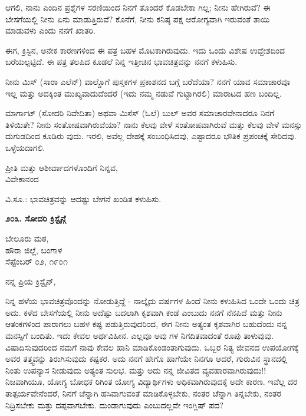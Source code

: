 ಆಗಲಿ, ನಾನು ಎಂದಿನ ಪ್ರಶ್ನೆಗಳ ಸರಣಿಯಿಂದ ನಿನಗೆ ತೊಂದರೆ ಕೊಡಬೇಕಾ ಗಿಲ್ಲ; ನೀನು ಹೇಗಿರುವೆ? ಈ ಬೇಸಗೆಯಲ್ಲಿ ನೀನು ಏನು ಮಾಡುತ್ತಿರುವೆ? ಕೊನೆಗೆ, ನೀನು ಕನಿಷ್ಠ ಪಕ್ಷ ಆರೋಗ್ಯವಾಗಿ ಇರುವಂತೆ ತಾಯಿ ಮಾಡುವಳು ಎಂದು ನನಗೆ ಖಾತರಿ.

ಈಗ, ಕ್ರಿಸ್ಟಿನ, ಅನೇಕ ಕಾರಣಗಳಿಂದ ಈ ಪತ್ರ ಬಹಳ ಮೊಟಕಾಗಿರುವುದು. ಇದು ಒಂದು ವಿಶೇಷ ಉದ್ದೇಶದಿಂದ ಬರೆಯಲ್ಪಟ್ಟಿದೆ. ಈ ಪತ್ರ ತಲಪಿದ ಕೂಡಲೆ ನಿನ್ನ ಇತ್ತೀಚಿನ ಭಾವಚಿತ್ರವನ್ನು ನನಗೆ ಕಳುಹಿಸು.

ನೀನು ಮಿಸ್ (ಸಾರಾ ಎಲೆನ್) ವಾಲ್ಡೊಗೆ ಪುಸ್ತಕಗಳ ಪ್ರಕಾಶನದ ಬಗ್ಗೆ ಬರೆದೆಯಾ? ನನಗೆ ಯಾವ ಸಮಾಚಾರವೂ ಇಲ್ಲ ಮತ್ತು ಅದಕ್ಕಿಂತ ಮುಖ್ಯವಾದುದೆಂದರೆ (ಇದು ನಮ್ಮ ನಡುವೆ ಗುಟ್ಟಾಗಿರಲಿ) ಮಾರಾಟದ ಹಣ ಬಂದಿಲ್ಲ.

ಮಾರ್ಗಾಟ್ (ಸೋದರಿ ನಿವೇದಿತಾ) ಅಥವಾ ಮಿಸೆಸ್ (ಓಲೆ) ಬುಲ್ ಅವರ ಸಮಾಚಾರವೇನಾದರೂ ನಿನಗೆ ತಿಳಿಯಿತೇ? ನೀನು ಸಂತೋಷವಾಗಿರುವೆಯಾ? ನಾನು ಕೆಲವು ವೇಳೆ ಸಂತೋಷವಾಗಿರುವೆ ಮತ್ತು ಕೆಲವು ವೇಳೆ ಮನಸ್ಸು ದುಗುಡದಿಂದ ಕೂಡಿರು ವುದು. ಇರಲಿ, ಅವೆಲ್ಲ ದೇಹಕ್ಕೆ ಸಂಬಂಧಿಸಿದವು, ಎಷ್ಟಾದರೂ ಭೌತಿಕ ಪ್ರಪಂಚಕ್ಕೆ ಸೇರಿದವು. ಒಳ್ಳೆಯದಾಗಲಿ.

\begin{flushright}
ಪ್ರೀತಿ ಮತ್ತು ಆಶೀರ್ವಾದಗಳೊಂದಿಗೆ ನಿನ್ನವ,\\ವಿವೇಕಾನಂದ
\end{flushright}

ವಿ.ಸೂ.: ಭಾವಚಿತ್ರವನ್ನು ಆದಷ್ಟು ಬೇಗನೆ ಖಂಡಿತ ಕಳುಹಿಸು.

\begin{center}
\textbf{೨೦೩. ಸೋದರಿ ಕ್ರಿಸ್ಟೈನ್ಗೆ}
\end{center}

\begin{flushright}
ಬೇಲೂರು ಮಠ,\\ಹೌರಾ ಜಿಲ್ಲೆ, ಬಂಗಾಳ\\ಸೆಪ್ಟೆಂಬರ್ ೦೨, ೧೯೦೧
\end{flushright}

ನನ್ನ ಪ್ರಿಯ ಕ್ರಿಸ್ಟೈನ್,

ನಿನ್ನ ಹಳೆಯ ಭಾವಚಿತ್ರವೊಂದನ್ನು ನೋಡುತ್ತಿದ್ದೆ - ನಾಲ್ಕೈದು ವರ್ಷಗಳ ಹಿಂದೆ ನೀನು ಕಳುಹಿಸಿದ ಒಂದೇ ಒಂದು ಚಿತ್ರ ಅದು. ಕಳೆದ ಬೇಸಗೆಯಲ್ಲಿ ನೀನು ಅದೆಷ್ಟು ಬದಲಾಗಿ ಕೃಶವಾಗಿ ಕಂಡೆ ಎಂಬುದು ನನಗೆ ನೆನಪಿದೆ ಮತ್ತು ನೀನು ಆತಂಕಗಳಿಂದ ಪಾರಾಗಲು ಬಹಳ ಕಷ್ಟ ಪಡುತ್ತಿರುವುದರಿಂದ, ಈಗ ನೀನು ಅತ್ಯಂತ ಕೃಶವಾಗಿರ ಬಹುದೆಂದು ನನ್ನ ಮನಸ್ಸಿಗೆ ಬಂದಿತು. ಇದು ಕೇವಲ ಅರ್ಥವಿಹೀನ. ಎಲ್ಲವೂ ಅವು ಗಳ ನಿಗದಿತವಾದಂತೆ ರೂಪು ತಾಳುವುವು. ವಿಷಾದಿಸುವುದರಿಂದ ನಮಗೆ ನಾವು ಕೇವಲ ಹಾನಿ ಮಾಡಿಕೊಂಡಂತಾಗುವುದು. ಒಬ್ಬರ ನಿತ್ಯ ಜೀವನದ ಉಪಯೋಗಕ್ಕೆ ಅವರ ತತ್ತ್ವವನ್ನು ತಿರುಗಿಸುವುದು ಕಷ್ಟಕರ. ಅದು ನನಗೆ ಹೇಗೊ ಹಾಗೆಯೇ ನಿನಗೂ ಆದರೆ, ಗುರುವಿನ ಸ್ಥಾನದಲ್ಲಿ ನಿಂತು ಉಪನ್ಯಾಸ ನೀಡುವುದು ಅತ್ಯಂತ ಸುಲಭ. ಮತ್ತು ಅದು ನನ್ನ ಜೀವಿತದ ವ್ಯವಹಾರವಾಗಿರುವುದು!! ನಿಜವಾಗಿಯೂ, ಯೋಗ್ಯ ಬೋಧಕ ರಿಗಿಂತ ಯೋಗ್ಯ ವಿದ್ಯಾರ್ಥಿಗಳು ಅಧಿಕವಾಗಿರುವುದಕ್ಕೆ ಅದೇ ಕಾರಣ. ಇವೆಲ್ಲ ದರ ತಾತ್ಪರ್ಯವೇನೆಂದರೆ, ನಿನಗೆ ಚೆನ್ನಾಗಿ ಹಸಿವಾಗುವಂತೆ ಮಾಡಿಕೊಳ್ಳಬೇಕು, ನಂತರ ಚೆನ್ನಾಗಿ ತಿನ್ನಬೇಕು, ನಂತರ ನಿದ್ರಿಸಬೇಕು ಮತ್ತು ದಪ್ಪವಾಗಬೇಕು. ದುಂಡಾಗುವುದು  ಎಂಬುದಲ್ಲವೇ ಇಂಗ್ಲಿಷ್ ಪದ?

